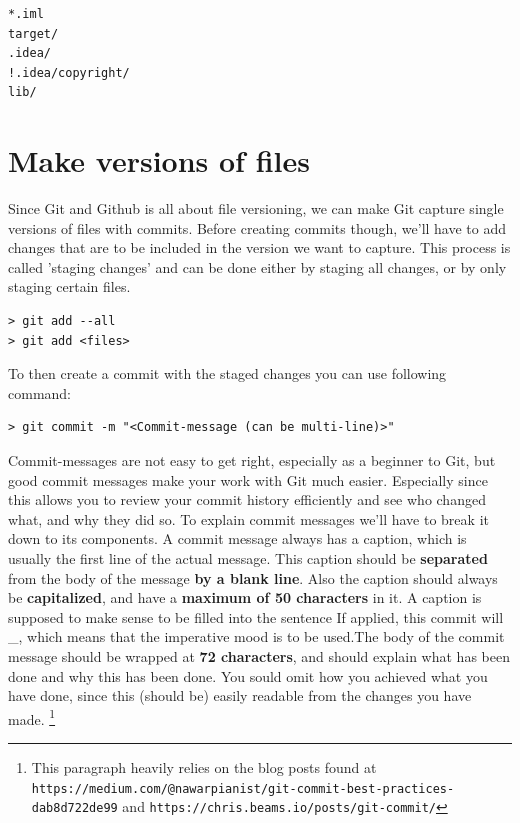 \documentclass[a4paper, 12pt]{article}
\begin{document}
		\begin{lstlisting}
*.iml
target/
.idea/
!.idea/copyright/
lib/
		\end{lstlisting}

	\section{Make versions of files}
	
		Since Git and Github is all about file versioning, we can make Git capture single versions of files with commits. Before creating commits though, we'll have to add changes that are to be included in the version we want to capture. This process is called 'staging changes' and can be done either by staging all changes, or by only staging certain files.
		
		\begin{lstlisting}
> git add --all
> git add <files>
		\end{lstlisting}
		
		To then create a commit with the staged changes you can use following command:
		
		\begin{lstlisting}
> git commit -m "<Commit-message (can be multi-line)>"
		\end{lstlisting}
		\newpage
		
		Commit-messages are not easy to get right, especially as a beginner to Git, but good commit messages make your work with Git much easier. Especially since this allows you to review your commit history efficiently and see who changed what, and why they did so. To explain commit messages we'll have to break it down to its components. A commit message always has a caption, which is usually the first line of the actual message. This caption should be \textbf{separated} from the body of the message \textbf{by a blank line}. Also the caption should always be \textbf{capitalized}, and have a \textbf{maximum of 50 characters} in it. A caption is supposed to make sense to be filled into the sentence \glqq If applied, this commit will \_\grqq, which means that the imperative mood is to be used.The body of the commit message should be wrapped at \textbf{72 characters}, and should explain what has been done and why this has been done. You sould omit how you achieved what you have done, since this (should be) easily readable from the changes you have made. \footnote{This paragraph heavily relies on the blog posts found at \lstinline|https://medium.com/@nawarpianist/git-commit-best-practices-dab8d722de99| and \lstinline|https://chris.beams.io/posts/git-commit/|}
		
\end{document}
